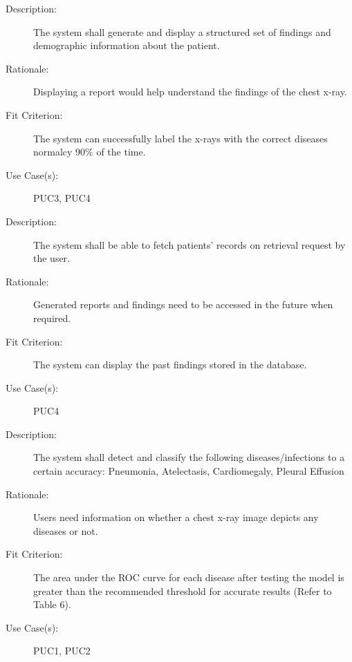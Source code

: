 \documentclass[12pt]{article}
\begin{document}
\begin{enumerate}[label=FR\arabic*., series=frs]
\begin{item}
\begin{description}
        \end{description}
    \end{item}
    \begin{item}
        \begin{description}
            \item[Description:] The system shall generate and display a structured set of findings and demographic information about the patient.
            \item[Rationale:] Displaying a report would help understand the findings of the chest x-ray.
            \item[Fit Criterion:] The system can successfully label the x-rays with the correct diseases normalcy 90\% of the time.
            \item[Use Case(s):] PUC3, PUC4
        \end{description}
    \end{item}
    \begin{item}
        \begin{description}
            \item[Description:] The system shall be able to fetch patients’ records on retrieval request by the user.
            \item[Rationale:] Generated reports and findings need to be accessed in the future when required.
            \item[Fit Criterion:] The system can display the past findings stored in the database.
            \item[Use Case(s):] PUC4
        \end{description}
    \end{item}
    \begin{item}
        \begin{description}
            \item[Description:] \hypertarget{FR5}{The system shall detect and classify the following diseases/infections to a certain accuracy: Pneumonia, Atelectasis, Cardiomegaly, Pleural Effusion}
            \item[Rationale:] Users need information on whether a chest x-ray image depicts any diseases or not.
            \item[Fit Criterion:] The area under the ROC curve for each disease after testing the model is greater than the recommended threshold for accurate results (Refer to Table 6). 
            \item[Use Case(s):] PUC1, PUC2
        \end{description}

\end{item}
\end{enumerate}
\end{document}
